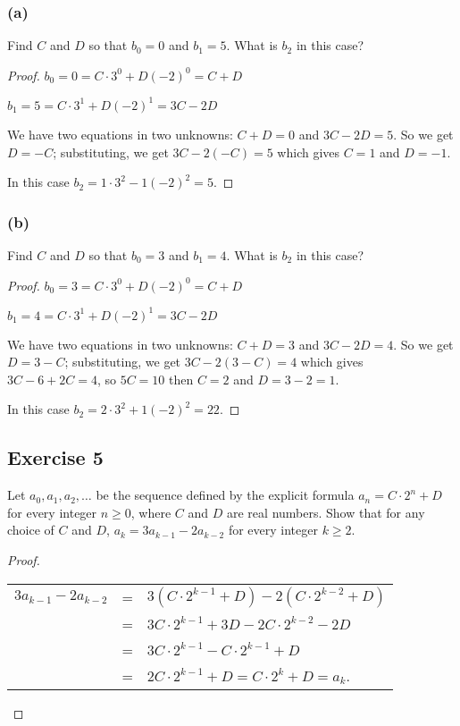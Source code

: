 \documentclass[14pt]{extarticle}
\begin{document}
\subsubsection{(a)}
Find $C$ and $D$ so that \(b_0 = 0\) and \(b_1 = 5\). What is $b_2$ in this case?

\begin{proof}
    \(b_0 = 0 = C \cdot 3^0 + D(-2)^0 = C + D\)

    \(b_1 = 5 = C \cdot 3^1 + D(-2)^1 = 3C - 2D\)

    We have two equations in two unknowns: \(C+D = 0\) and \(3C-2D = 5\). So we get $D = -C$; substituting, we get
    \(3C -2(-C) = 5\) which gives $C = 1$ and $D = -1$.

    In this case \(b_2 = 1 \cdot 3^2 - 1(-2)^2 = 5\).
\end{proof}

\subsubsection{(b)}
Find $C$ and $D$ so that \(b_0 = 3\) and \(b_1 = 4\). What is $b_2$ in this case?

\begin{proof}
    \(b_0 = 3 = C \cdot 3^0 + D(-2)^0 = C + D\)

    \(b_1 = 4 = C \cdot 3^1 + D(-2)^1 = 3C - 2D\)

    We have two equations in two unknowns: \(C+D = 3\) and \(3C-2D = 4\). So we get $D = 3-C$; substituting, we get
    \(3C -2(3-C) = 4\) which gives \(3C - 6 + 2C = 4\), so $5C = 10$ then $C = 2$ and $D = 3-2 = 1$.

    In this case \(b_2 = 2 \cdot 3^2 + 1(-2)^2 = 22\).
\end{proof}

\subsection{Exercise 5}
Let \(a_0, a_1, a_2, \ldots\) be the sequence defined by the explicit formula \(a_n = C \cdot 2^n + D\) for every
integer \(n \geq 0\), where $C$ and $D$ are real numbers.
Show that for any choice of $C$ and $D$, \(a_k = 3a_{k-1} - 2a_{k-2}\) for every integer \(k \geq 2\).

\begin{proof}
    \begin{tabular}{rcl}
        \(3a_{k-1} - 2a_{k-2}\) & = & \(3(C \cdot 2^{k-1} + D) - 2(C \cdot 2^{k-2} + D)\) \\
                                & = & \(3C \cdot 2^{k-1} + 3D - 2C \cdot 2^{k-2} -2D\)    \\
                                & = & \(3C \cdot 2^{k-1} - C \cdot 2^{k-1} + D\)          \\
                                & = & \(2C \cdot 2^{k-1} + D = C \cdot 2^k + D = a_k\).
    \end{tabular}
\end{proof}
\end{document}
